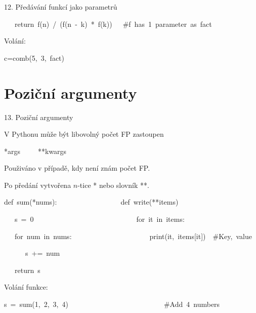 \documentclass[czech]{beamer}
\newenvironment{lyxcode}
  {\par\begin{list}{}{
    \setlength{\rightmargin}{\leftmargin}
    \setlength{\listparindent}{0pt}%
    \raggedright
    \setlength{\itemsep}{0pt}
    \setlength{\parsep}{0pt}
    \normalfont\ttfamily}%
   \def\{{\char`\{}
   \def\}{\char`\}}
   \def\textasciitilde{\char`\~}
   \item[]}
  {\end{list}}
\begin{document}
\begin{frame}{12. Předávání funkcí jako parametrů}
\begin{lyxcode}
{\scriptsize ~~~return~f(n)~/~(f(n~-~k)~{*}~f(k))~~~\#f~has~1~parameter~as~fact}{\scriptsize\par}
\end{lyxcode}
{\scriptsize Volání:}{\scriptsize\par}
\begin{lyxcode}
{\scriptsize c=comb(5,~3,~fact)}{\scriptsize\par}
\end{lyxcode}
\end{frame}


\section{Poziční argumenty}
\begin{frame}[plain]{13. Poziční argumenty}

{\scriptsize V Pythonu může být libovolný počet FP zastoupen}{\scriptsize\par}
\begin{lyxcode}
{\scriptsize{*}args~~~~~{*}{*}kwargs}{\scriptsize\par}
\end{lyxcode}
{\scriptsize Použiváno v případě, kdy není znám počet FP.}{\scriptsize\par}

{\scriptsize Po předání vytvořena $n$-tice {*} nebo slovník {*}{*}.}{\scriptsize\par}
\begin{lyxcode}
{\scriptsize def~sum({*}nums):~~~~~~~~~~~~~~~~~~def~write({*}{*}items)}{\scriptsize\par}

{\scriptsize ~~~s~=~0~~~~~~~~~~~~~~~~~~~~~~~~~~~~~for~it~in~items:~}{\scriptsize\par}

{\scriptsize ~~~for~num~in~nums:~~~~~~~~~~~~~~~~~~~~~~print(it,~items{[}it{]})~~\#Key,~value}{\scriptsize\par}

{\scriptsize ~~~~~~s~+=~num~~~~~~~~}{\scriptsize\par}

{\scriptsize ~~~return~s~~~}{\scriptsize\par}
\end{lyxcode}
{\scriptsize Volání funkce:}{\scriptsize\par}
\begin{lyxcode}
{\scriptsize s~=~sum(1,~2,~3,~4)~~~~~~~~~~~~~~~~~~~~~~~~~~~\#Add~4~numbers}{\scriptsize\par}


\end{lyxcode}
\end{frame}
\end{document}
